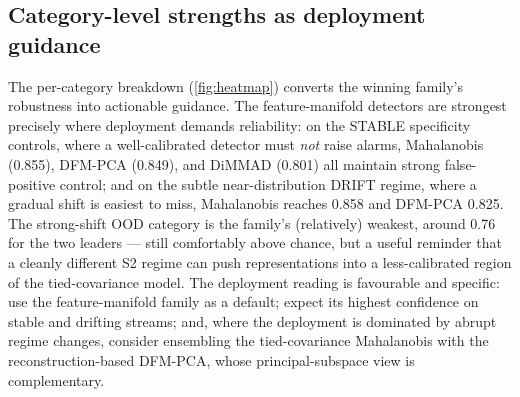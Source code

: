 \subsection{Category-level strengths as deployment guidance}\label{sec:disc-category}
The per-category breakdown (\cref{fig:heatmap}) converts the winning family's
robustness into actionable guidance. The feature-manifold detectors are strongest
precisely where deployment demands reliability: on the STABLE specificity controls,
where a well-calibrated detector must \emph{not} raise alarms, Mahalanobis
(\num{0.855}), DFM-PCA (\num{0.849}), and DiMMAD (\num{0.801}) all maintain strong
false-positive control; and on the subtle near-distribution DRIFT regime, where a
gradual shift is easiest to miss, Mahalanobis reaches \num{0.858} and DFM-PCA
\num{0.825}. The strong-shift OOD category is the family's (relatively) weakest,
around \num{0.76} for the two leaders --- still comfortably above chance, but a
useful reminder that a cleanly different S2 regime can push representations into a
less-calibrated region of the tied-covariance model. The deployment reading is
favourable and specific: use the feature-manifold family as a default; expect its
highest confidence on stable and drifting streams; and, where the deployment is
dominated by abrupt regime changes, consider ensembling the tied-covariance
Mahalanobis with the reconstruction-based DFM-PCA, whose principal-subspace view is
complementary.

